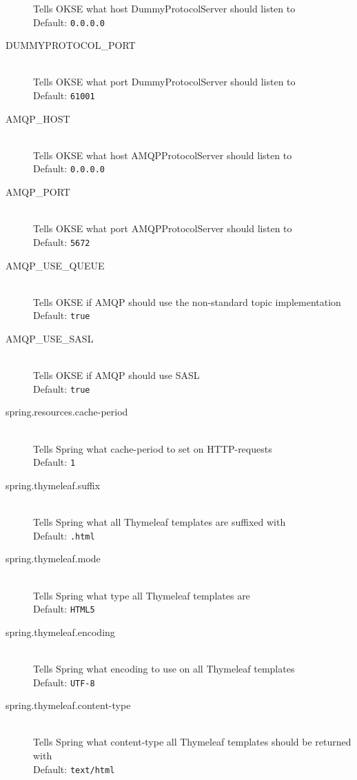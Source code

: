 \begin{description}
  Tells OKSE what host DummyProtocolServer should listen to \hfill \\ Default: \verb!0.0.0.0!
  \item[DUMMYPROTOCOL\_PORT] \hfill \\
  Tells OKSE what port DummyProtocolServer should listen to \hfill \\ Default: \verb!61001!
  \item[AMQP\_HOST] \hfill \\
  Tells OKSE what host AMQPProtocolServer should listen to \hfill \\ Default: \verb!0.0.0.0!
  \item[AMQP\_PORT] \hfill \\
  Tells OKSE what port AMQPProtocolServer should listen to \hfill \\ Default: \verb!5672!
  \item[AMQP\_USE\_QUEUE] \hfill \\
  Tells OKSE if AMQP should use the non-standard topic implementation \hfill \\ Default: \verb!true!
  \item[AMQP\_USE\_SASL] \hfill \\
  Tells OKSE if AMQP should use SASL \hfill \\ Default: \verb!true!
  \item[spring.resources.cache-period] \hfill \\
  Tells Spring what cache-period to set on HTTP-requests \hfill \\ Default: \verb!1!
  \item[spring.thymeleaf.suffix] \hfill \\
  Tells Spring what all Thymeleaf templates are suffixed with \hfill \\ Default: \verb!.html! 
   \item[spring.thymeleaf.mode] \hfill \\
  Tells Spring what type all Thymeleaf templates are \hfill \\ Default: \verb!HTML5!
   \item[spring.thymeleaf.encoding] \hfill \\
  Tells Spring what encoding to use on all Thymeleaf templates \hfill \\ Default: \verb!UTF-8!
   \item[spring.thymeleaf.content-type] \hfill \\
  Tells Spring what content-type all Thymeleaf templates should be returned with \hfill \\ Default: \verb!text/html! 
\end{description}
  
